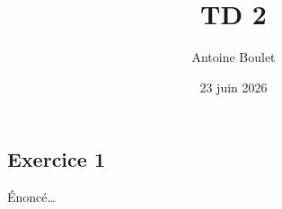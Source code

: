 \documentclass[
  french,
  11pt,
]{article}
\title{TD 2}
\author{Antoine Boulet}
\date{23 juin 2026}
\begin{document}
\maketitle


\subsection{Exercice 1}\label{exercice-1}

Énoncé\ldots{}
\end{document}
